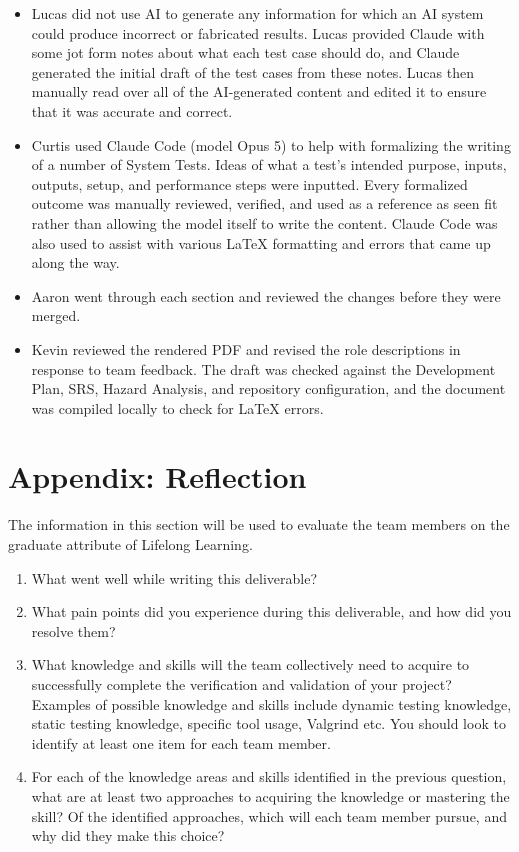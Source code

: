 \documentclass[12pt, titlepage]{article}
\begin{document}
\begin{itemize}
    \item Lucas did not use AI to generate any information for which an AI system could produce incorrect or fabricated results. 
    Lucas provided Claude with some jot form notes about what each test case should do, and Claude generated the initial draft of the test cases from these notes.
    Lucas then manually read over all of the AI-generated content and edited it to ensure that it was accurate and correct.
    \item Curtis used Claude Code (model Opus 5) to help with formalizing the writing of a number of System Tests. Ideas of what a test's intended purpose, inputs,
    outputs, setup, and performance steps were inputted. Every formalized outcome was manually reviewed, verified, and used as a reference as seen fit rather than allowing the
    model itself to write the content. Claude Code was also used to assist with various LaTeX formatting and errors that came up along the way.
    \item Aaron went through each section and reviewed the changes before they were merged.
    \item Kevin reviewed the rendered PDF and revised the role descriptions
    in response to team feedback. The draft was checked against the Development
    Plan, SRS, Hazard Analysis, and repository configuration, and the document
    was compiled locally to check for LaTeX errors.
\end{itemize}

\newpage{}

\section{Appendix: Reflection}

The information in this section will be used to evaluate the team members on the
graduate attribute of Lifelong Learning.


\begin{enumerate}
  \item What went well while writing this deliverable? 
  \item What pain points did you experience during this deliverable, and how
    did you resolve them?
  \item What knowledge and skills will the team collectively need to acquire to
  successfully complete the verification and validation of your project?
  Examples of possible knowledge and skills include dynamic testing knowledge,
  static testing knowledge, specific tool usage, Valgrind etc.  You should look to
  identify at least one item for each team member.
  \item For each of the knowledge areas and skills identified in the previous
  question, what are at least two approaches to acquiring the knowledge or
  mastering the skill?  Of the identified approaches, which will each team
  member pursue, and why did they make this choice?
\end{enumerate}





\end{document}
